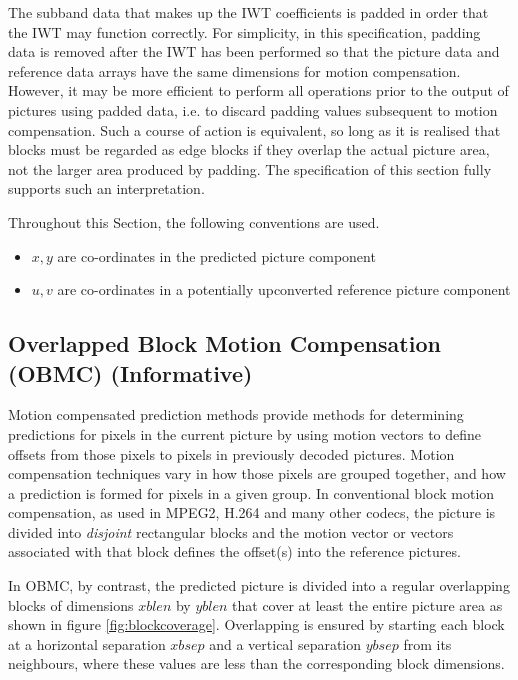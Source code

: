 \begin{informative}
The subband data that makes up the IWT coefficients is padded in order that the IWT
may function correctly. For simplicity, in this specification, padding data is removed
after the IWT has been performed so that the picture data and reference data arrays have
the same dimensions for motion compensation. However, it may be more efficient to perform
all operations prior to the output of pictures using padded data, i.e. to discard padding values
subsequent to motion compensation. Such a course of action is equivalent, so long as it is realised
that blocks must be regarded as edge blocks if they overlap the actual picture area, not the
larger area produced by padding. The specification of this section fully supports such an 
interpretation.
\end{informative}

Throughout this Section, the following conventions are used.

\begin{itemize}
\item $x,y$ are co-ordinates in the predicted picture component
\item $u,v$ are co-ordinates in a potentially upconverted reference picture component
\end{itemize}

\begin{informative*}
\subsection{Overlapped Block Motion Compensation (OBMC) (Informative)}

Motion compensated prediction methods provide methods for determining 
predictions for pixels in the current picture by using motion vectors to 
define offsets from those pixels to pixels in previously decoded
pictures. Motion compensation techniques vary in how those pixels are grouped
together, and how a prediction is formed for pixels in a given group. In 
conventional  block motion compensation, as used in MPEG2, H.264 and many other
codecs, the picture is divided into {\em disjoint} rectangular blocks and the
motion vector or vectors associated with that block defines the offset(s) into
the reference pictures.

In OBMC, by contrast, the predicted picture is divided into a regular overlapping 
blocks of dimensions $xblen$ by $yblen$ that cover at least the entire picture 
area as shown in figure \ref{fig:blockcoverage}.  Overlapping is ensured by starting
each block at a horizontal separation $xbsep$ and a vertical separation $ybsep$ 
from its neighbours, where these values are less than the corresponding block dimensions.
\end{informative*}


